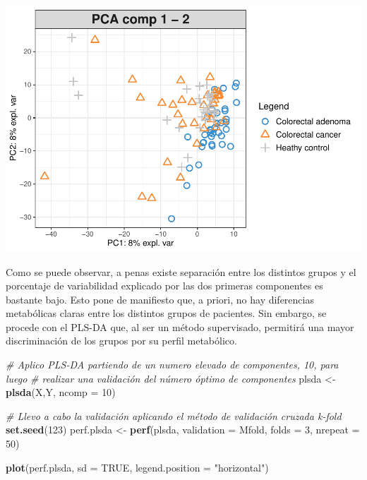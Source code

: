 \documentclass[
]{article}
\newenvironment{Shaded}{\begin{snugshade}}{\end{snugshade}}
\newcommand{\AttributeTok}[1]{\textcolor[rgb]{0.13,0.29,0.53}{#1}}
\newcommand{\CommentTok}[1]{\textcolor[rgb]{0.56,0.35,0.01}{\textit{#1}}}
\newcommand{\ConstantTok}[1]{\textcolor[rgb]{0.56,0.35,0.01}{#1}}
\newcommand{\DecValTok}[1]{\textcolor[rgb]{0.00,0.00,0.81}{#1}}
\newcommand{\FunctionTok}[1]{\textcolor[rgb]{0.13,0.29,0.53}{\textbf{#1}}}
\newcommand{\NormalTok}[1]{#1}
\newcommand{\OtherTok}[1]{\textcolor[rgb]{0.56,0.35,0.01}{#1}}
\newcommand{\StringTok}[1]{\textcolor[rgb]{0.31,0.60,0.02}{#1}}
\begin{document}
\begin{center}\includegraphics[width=0.6\linewidth]{Getino-Alvarez-Lidia-PEC1_files/figure-latex/PCA Analysis-1} \end{center}

Como se puede observar, a penas existe separación entre los distintos
grupos y el porcentaje de variabilidad explicado por las dos primeras
componentes es bastante bajo. Esto pone de manifiesto que, a priori, no
hay diferencias metabólicas claras entre los distintos grupos de
pacientes. Sin embargo, se procede con el PLS-DA que, al ser un método
supervisado, permitirá una mayor discriminación de los grupos por su
perfil metabólico.

\begin{Shaded}
\begin{Highlighting}[]
\CommentTok{\# Aplico PLS{-}DA partiendo de un numero elevado de componentes, 10, para luego}
\CommentTok{\# realizar una validación del número óptimo de componentes}
\NormalTok{plsda }\OtherTok{\textless{}{-}} \FunctionTok{plsda}\NormalTok{(X,Y, }\AttributeTok{ncomp =} \DecValTok{10}\NormalTok{)}

\CommentTok{\# Llevo a cabo la validación aplicando el método de validación cruzada k{-}fold}
\FunctionTok{set.seed}\NormalTok{(}\DecValTok{123}\NormalTok{)}
\NormalTok{perf.plsda }\OtherTok{\textless{}{-}} \FunctionTok{perf}\NormalTok{(plsda, }\AttributeTok{validation =} \StringTok{\textquotesingle{}Mfold\textquotesingle{}}\NormalTok{, }\AttributeTok{folds =} \DecValTok{3}\NormalTok{,}
                   \AttributeTok{nrepeat =} \DecValTok{50}\NormalTok{)}

\FunctionTok{plot}\NormalTok{(perf.plsda, }\AttributeTok{sd =} \ConstantTok{TRUE}\NormalTok{, }\AttributeTok{legend.position =} \StringTok{"horizontal"}\NormalTok{)}
\end{Highlighting}
\end{Shaded}
\end{document}

